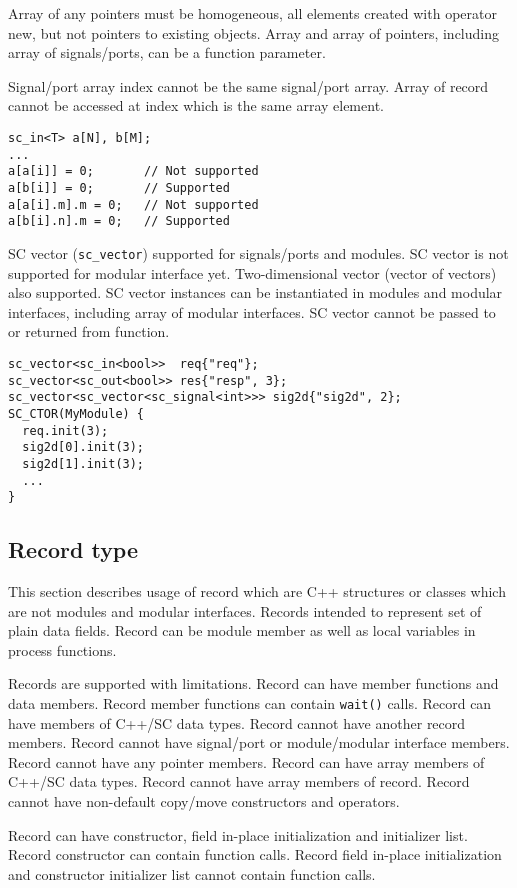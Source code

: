 Array of any pointers must be homogeneous, all elements created with operator new, but not pointers to existing objects. 
Array and array of pointers, including array of signals/ports, can be a function parameter. 
 
Signal/port array index cannot be the same signal/port array. Array of record cannot be accessed at index which is the same array element.
%
\begin{lstlisting}[style=mycpp]
sc_in<T> a[N], b[M]; 
...
a[a[i]] = 0;       // Not supported 
a[b[i]] = 0;       // Supported
a[a[i].m].m = 0;   // Not supported 
a[b[i].n].m = 0;   // Supported
\end{lstlisting}

SC vector ({\tt sc\_vector}) supported for signals/ports and modules. SC vector is not supported for modular interface yet. Two-dimensional vector (vector of vectors) also supported. SC vector instances can be instantiated in modules and modular interfaces, including array of modular interfaces. SC vector cannot be passed to or returned from function.
%
\begin{lstlisting}[style=mycpp]
sc_vector<sc_in<bool>>  req{"req"};
sc_vector<sc_out<bool>> res{"resp", 3};
sc_vector<sc_vector<sc_signal<int>>> sig2d{"sig2d", 2};
SC_CTOR(MyModule) {
  req.init(3);
  sig2d[0].init(3);
  sig2d[1].init(3);        
  ...
}
\end{lstlisting}



\subsection{Record type}

This section describes usage of record which are C++ structures or classes which are not modules and modular interfaces. Records intended to represent set of plain data fields. Record can be module member as well as local variables in process functions. 

Records are supported with limitations. Record can have member functions and data members. Record member functions can contain {\tt wait()} calls. Record can have members of C++/SC data types. Record cannot have another record members. Record cannot have signal/port or module/modular interface members. Record cannot have any pointer members. Record can have array members of C++/SC data types. Record cannot have array members of record. Record cannot have non-default copy/move constructors and operators.

Record can have constructor, field in-place initialization and initializer list. Record constructor can contain function calls. Record field in-place initialization and constructor initializer list cannot contain function calls.

